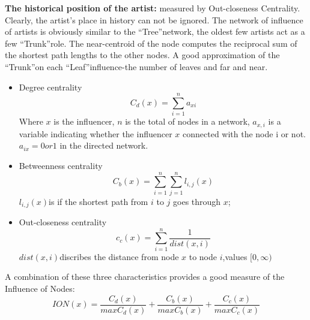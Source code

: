 \documentclass[conference]{IEEEtran}
\begin{document}
\textbf{The historical position of the artist:} measured by Out-closeness Centrality. Clearly, the artist’s place in history can not be ignored. The network of influence of artists is obviously similar to the “Tree”network, the oldest few artists act as a few “Trunk”role. The near-centroid of the node computes the reciprocal sum of the shortest path lengths to the other nodes. A good approximation of the “Trunk”on each “Leaf”influence-the number of leaves and far and near.
\begin{itemize}
	\item Degree centrality
	\[C_d(x)=\sum_{i=1}^{n}a_{xi}\]
	Where $x$ is the influencer, $n$ is the total of nodes in a network, $a_{x,i}$ is a variable indicating whether the influencer $x$ connected with the node i or not. $a_{ix}=0 or 1$ in the directed network.
	
	\item Betweenness centrality
	\[C_b(x)= \sum_{i=1}^{n}\sum_{j=1}^{n}{l_{i,j}(x)}\]
	$l_{i,j}(x)$is if the shortest path from $i$ to $j$ goes through $x$;
	
	\item Out-closeness centrality
	\[ c_c(x)= \sum_{i=1}^{n}\frac{1}{dist(x,i)} \]
	$dist(x,i)$discribes the distance from node $x$ to node $i$,values $[0,\infty)$
\end{itemize}
A combination of these three characteristics provides a good measure of the Influence of Nodes:
\begin{equation}\label{eq:similarity of nodes}
ION(x)= \frac{C_d (x)}{max C_d (x)} +\frac{C_b (x)}{max C_b (x)}+\frac{C_c (x)}{max C_c (x)}
\end{equation}
\end{document}
